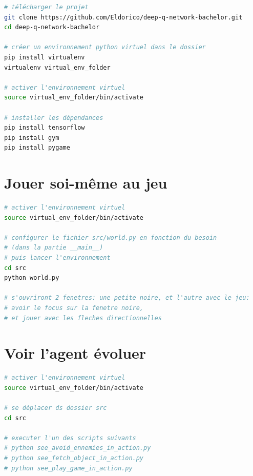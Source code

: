 \documentclass[11pt,a4paper]{report}
\begin{document}
  \begin{lstlisting}[language=bash]
# télécharger le projet
git clone https://github.com/Eldorico/deep-q-network-bachelor.git
cd deep-q-network-bachelor

# créer un environnement python virtuel dans le dossier
pip install virtualenv
virtualenv virtual_env_folder

# activer l'environnement virtuel
source virtual_env_folder/bin/activate

# installer les dépendances
pip install tensorflow
pip install gym
pip install pygame
  \end{lstlisting}  
  
 \section{Jouer soi-même au jeu}
  \begin{lstlisting}[language=bash]
# activer l'environnement virtuel
source virtual_env_folder/bin/activate

# configurer le fichier src/world.py en fonction du besoin
# (dans la partie __main__)
# puis lancer l'environnement
cd src
python world.py

# s'ouvriront 2 fenetres: une petite noire, et l'autre avec le jeu:
# avoir le focus sur la fenetre noire, 
# et jouer avec les fleches directionnelles
  \end{lstlisting}  

 \newpage  
  
 \section{Voir l'agent évoluer}
  \begin{lstlisting}[language=bash]
# activer l'environnement virtuel
source virtual_env_folder/bin/activate

# se déplacer ds dossier src
cd src 

# executer l'un des scripts suivants
# python see_avoid_ennemies_in_action.py
# python see_fetch_object_in_action.py
# python see_play_game_in_action.py
  \end{lstlisting}  
\end{document}
